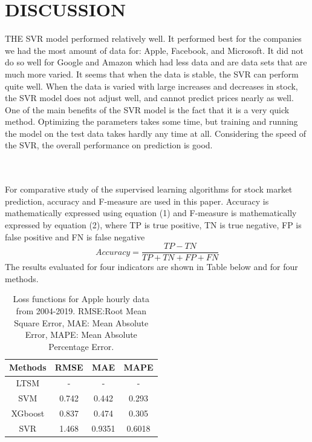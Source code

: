 \usepackage{fancyhdr}\documentclass[conference]{IEEEtran}
\begin{document}
\section{DISCUSSION}
THE SVR model performed relatively well. It performed best for the companies we had the most amount of data for: Apple, Facebook, and Microsoft. It did not do so well for Google and Amazon which had less data and are data sets that are much more varied. It seems that when the data is stable, the SVR can perform quite well. When the data is varied with large increases and decreases in stock, the SVR model does not adjust well, and cannot predict prices nearly as well. One of the main benefits of the SVR model is the fact that it is a very quick method. Optimizing the parameters takes some time, but training and running the model on the test data takes hardly any time at all. Considering the speed of the SVR, the overall performance on prediction is good.  

\\
\\
For comparative study of the supervised learning algorithms for stock market prediction, accuracy and F-measure are used in this paper. Accuracy is mathematically expressed using equation (1) and F-measure is mathematically expressed by equation (2), where TP is true positive, TN is true negative, FP is false positive and FN is false negative
\begin{equation}
    Accuracy= \frac{TP-TN}{TP+TN+FP+FN}
\end{equation}
The results evaluated for four indicators are shown in Table below and for four methods.


\begin{table}[]
\begin{center}
 \begin{tabular}{||c | c c c||} 
 \hline
 Methods & RMSE & MAE & MAPE \\ [0.5ex] 
 \hline\hline
LTSM & - & - & - \\ 
 \hline
SVM & 0.742 & 0.442 & 0.293 \\
 \hline
XGboost & 0.837 & 0.474 & 0.305 \\
 \hline
SVR & 1.468 & 0.9351 & 0.6018 \\
 \hline
\end{tabular}
\end{center}
    \caption{Loss functions for Apple hourly data from 2004-2019. RMSE:Root Mean Square Error, MAE: Mean Absolute Error, MAPE: Mean Absolute Percentage Error. }
    \label{tab:my_label}
\end{table}
\end{document}

